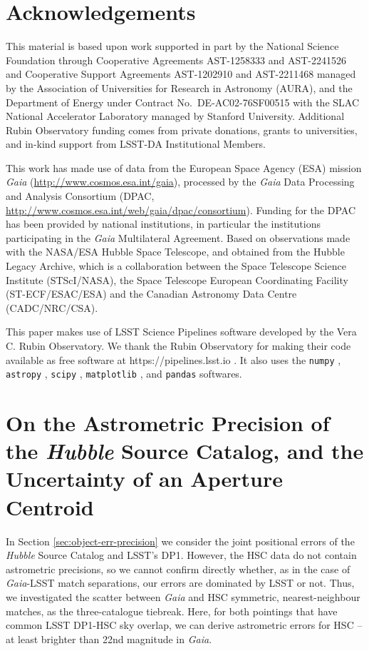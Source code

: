 \documentclass[SE,lsstdraft,authoryear,toc]{lsstdoc}
\begin{document}
\appendix

\section{Acknowledgements}

This material is based upon work supported in part by the National Science Foundation through Cooperative Agreements AST-1258333 and AST-2241526 and Cooperative Support Agreements AST-1202910 and AST-2211468 managed by the Association of Universities for Research in Astronomy (AURA), and the Department of Energy under Contract No.\ DE-AC02-76SF00515 with the SLAC National Accelerator Laboratory managed by Stanford University.
Additional Rubin Observatory funding comes from private donations, grants to universities, and in-kind support from LSST-DA Institutional Members.

This work has made use of data from the European Space Agency (ESA) mission \textit{Gaia} (\url{http://www.cosmos.esa.int/gaia}), processed by the \textit{Gaia} Data Processing and Analysis Consortium (DPAC, \url{http://www.cosmos.esa.int/web/gaia/dpac/consortium}). Funding for the DPAC has been provided by national institutions, in particular the institutions participating in the \textit{Gaia} Multilateral Agreement.
Based on observations made with the NASA/ESA Hubble Space Telescope, and obtained from the Hubble Legacy Archive, which is a collaboration between the Space Telescope Science Institute (STScI/NASA), the Space Telescope European Coordinating Facility (ST-ECF/ESAC/ESA) and the Canadian Astronomy Data Centre (CADC/NRC/CSA).

This paper makes use of LSST Science Pipelines software developed by the Vera C. Rubin Observatory. We thank the Rubin Observatory for making their code available as free software at https://pipelines.lsst.io \citep{NDVRO2025,Jenness2022}.
It also uses the \texttt{numpy} \citep{Harris2020}, \texttt{astropy} \citep{2013A&A...558A..33A,2018AJ....156..123A}, \texttt{scipy} \citep{scipy}, \texttt{matplotlib} \citep{matplotlib}, and \texttt{pandas} \citep{mckinney-proc-scipy-2010-pandas} softwares.

\section{On the Astrometric Precision of the \textit{Hubble} Source Catalog, and the Uncertainty of an Aperture Centroid}
\label{sec:hsc_appendix}
In Section \ref{sec:object-err-precision} we consider the joint positional errors of the \textit{Hubble} Source Catalog and LSST's DP1.
However, the HSC data do not contain astrometric precisions, so we cannot confirm directly whether, as in the case of \textit{Gaia}-LSST match separations, our errors are dominated by LSST or not.
Thus, we investigated the scatter between \textit{Gaia} and HSC symmetric, nearest-neighbour matches, as the three-catalogue tiebreak.
Here, for both pointings that have common LSST DP1-HSC sky overlap, we can derive astrometric errors for HSC -- at least brighter than 22nd magnitude in \textit{Gaia}.
\end{document}
